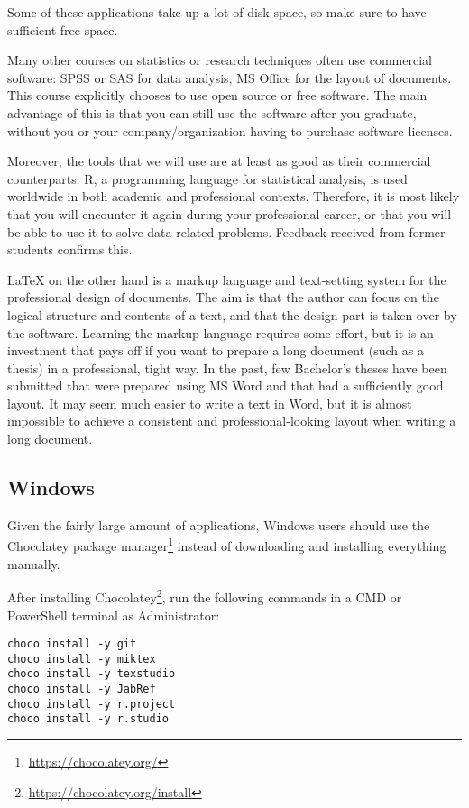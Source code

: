 Some of these applications take up a lot of disk space, so make sure to have sufficient free space.

Many other courses on statistics or research techniques often use commercial software: SPSS or SAS for data analysis, MS Office for the layout of documents. This course explicitly chooses to use open source or free software. The main advantage of this is that you can still use the software after you graduate, without you or your company/organization having to purchase software licenses.

Moreover, the tools that we will use are at least as good as their commercial counterparts. R, a programming language for statistical analysis, is used worldwide in both academic and professional contexts. Therefore, it is most likely that you will encounter it again during your professional career, or that you will be able to use it to solve data-related problems. Feedback received from former students confirms this.

\LaTeX{} on the other hand is a markup language and text-setting system for the professional design of documents. The aim is that the author can focus on the logical structure and contents of a text, and that the design part is taken over by the software. Learning the markup language requires some effort, but it is an investment that pays off if you want to prepare a long document (such as a thesis) in a professional, tight way. In the past, few Bachelor's theses have been submitted that were prepared using MS Word and that had a sufficiently good layout. It may seem much easier to write a text in Word, but it is almost impossible to achieve a consistent and professional-looking layout when writing a long document.

\subsection{Windows}

Given the fairly large amount of applications, Windows users should use the Chocolatey package manager\footnote{\url{https://chocolatey.org/}} instead of downloading and installing everything manually.

After installing Chocolatey\footnote{\url{https://chocolatey.org/install}}, run the following commands in a CMD or PowerShell terminal as Administrator:

\begin{verbatim}
choco install -y git
choco install -y miktex
choco install -y texstudio
choco install -y JabRef
choco install -y r.project
choco install -y r.studio
\end{verbatim}

